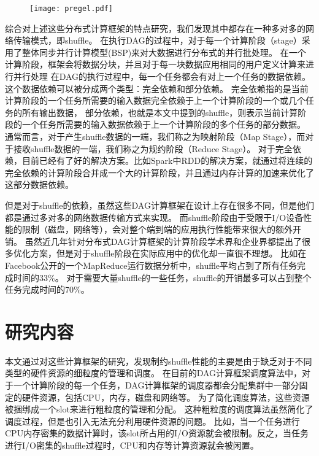 \begin{figure}[!htp]
    \centering
    \texttt{[image: pregel.pdf]}
\end{figure}

综合对上述这些分布式计算框架的特点研究，我们发现其中都存在一种多对多的网络传输模式，即shuffle。
在执行DAG的过程中，对于每一个计算阶段（stage）采用了整体同步并行计算模型(BSP)来对大数据进行分布式的并行批处理。
在一个计算阶段，框架会将数据分块，并且对于每一块数据应用相同的用户定义计算来进行并行处理
在DAG的执行过程中，每一个任务都会有对上一个任务的数据依赖。这个数据依赖可以被分成两个类型：完全依赖和部分依赖。
完全依赖指的是当前计算阶段的一个任务所需要的输入数据完全依赖于上一个计算阶段的一个或几个任务的所有输出数据，
部分依赖，也就是本文中提到的shuffle，则表示当前计算阶段的一个任务所需要的输入数据依赖于上一个计算阶段的多个任务的部分数据。
通常而言，对于产生shuffle数据的一端，我们称之为映射阶段（Map Stage），而对于接收shuffle数据的一端，我们称之为规约阶段（Reduce Stage）。
对于完全依赖，目前已经有了好的解决方案。比如Spark\cite{apachespark}中RDD\cite{spark}的解决方案，就通过将连续的完全依赖的计算阶段合并成一个大的计算阶段，并且通过内存计算的加速来优化了这部分数据依赖。

但是对于shuffle的依赖，虽然这些DAG计算框架在设计上存在很多不同，但是他们都是通过多对多的网络数据传输方式来实现。
而shuffle阶段由于受限于I/O设备性能的限制（磁盘，网络等），会对整个端到端的应用执行性能带来很大的额外开销。
虽然近几年针对分布式DAG计算框架的计算阶段学术界和企业界都提出了很多优化方案\cite{pacman, babu, quincy, sync}，但是对于shuffle阶段在实际应用中的优化却一直很不理想。
比如在Facebook公开的一个MapReduce运行数据分析中，shuffle平均占到了所有任务完成时间的33\%。
对于需要大量shuffle的一些任务，shuffle的开销最多可以占到整个任务完成时间的70\%\cite{managing}。

\section{研究内容}

本文通过对这些计算框架的研究，发现制约shuffle性能的主要是由于缺乏对于不同类型的硬件资源的细粒度的管理和调度。
在目前的DAG计算框架调度算法中，对于一个计算阶段的每一个任务，DAG计算框架的调度器都会分配集群中一部分固定的硬件资源，包括CPU，内存，磁盘和网络等。
为了简化调度算法，这些资源被捆绑成一个slot来进行粗粒度的管理和分配。
这种粗粒度的调度算法虽然简化了调度过程，但是也引入无法充分利用硬件资源的问题。
比如，当一个任务进行CPU内存密集的数据计算时，该slot所占用的I/O资源就会被限制。反之，当任务进行I/O密集的shuffle过程时，CPU和内存等计算资源就会被闲置。

